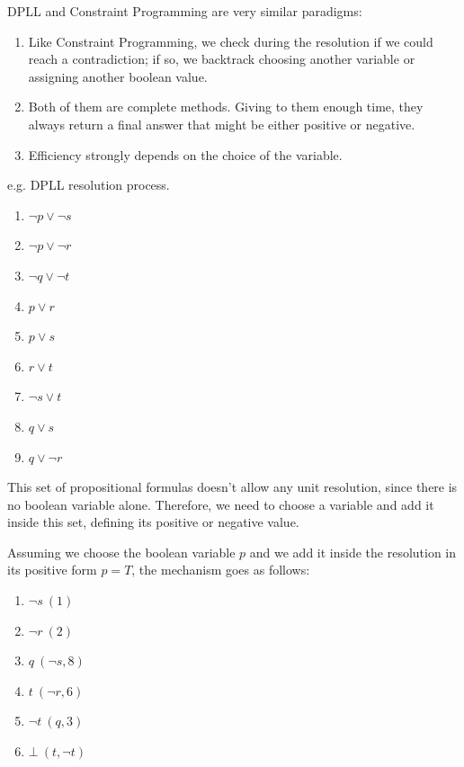 DPLL and Constraint Programming are very similar paradigms:
\begin{enumerate}
    \item Like Constraint Programming, we check during the resolution if we could reach a contradiction; if so, we backtrack choosing another variable or assigning another boolean value.
    \item Both of them are complete methods. Giving to them enough time, they always return a final answer that might be either positive or negative.
    \item Efficiency strongly depends on the choice of the variable.
\end{enumerate}
\begin{example}
    e.g. DPLL resolution process. \vspace{7pt}

    \begin{enumerate}
        \item $\neg p \lor \neg s$
        \item $\neg p \lor \neg r$
        \item $\neg q \lor \neg t$
        \item $p \lor r$
        \item $p \lor s$
        \item $r \lor t$
        \item $\neg s \lor t$
        \item $q \lor s$
        \item $q \lor \neg r$
    \end{enumerate} \vspace{7pt}

    This set of propositional formulas doesn't allow any unit resolution, since there is no boolean variable alone. Therefore, we need to choose a variable 
    and add it inside this set, defining its positive or negative value. \vspace{7pt}

    Assuming we choose the boolean variable $p$ and we add it inside the resolution in its positive form $p = T$, the mechanism goes as follows:
    \begin{enumerate}
        \item $\neg s \ (1)$ 
        \item $\neg r \ (2)$
        \item $q \ (\neg s, 8)$ 
        \item $t \ (\neg r, 6)$
        \item $\neg t \ (q, 3)$
        \item $\bot \ (t, \neg t)$
    \end{enumerate} \vspace{7pt}


\end{example}
